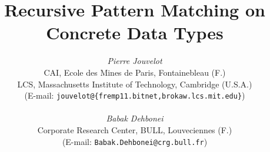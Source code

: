 
\title{Recursive Pattern Matching on Concrete Data Types}

\author{{\em Pierre Jouvelot} \\
CAI, Ecole des Mines de Paris, Fontainebleau (F.) \\
LCS, Massachusetts Institute of Technology, Cambridge (U.S.A.) \\
({\small E-mail: {\tt jouvelot@\{fremp11.bitnet,brokaw.lcs.mit.edu\}}}) \\
\\
{\em Babak Dehbonei} \\
Corporate Research Center, BULL, Louveciennes (F.) \\
({\small E-mail: {\tt Babak.Dehbonei@crg.bull.fr}})}

\date{}

\newcommand{\rpm}{{\tt rpm}}
\newcommand{\E}{\mbox{${\cal E}$}}
\newcommand{\C}{\mbox{${\cal C}$}}
\renewcommand{\P}{\mbox{${\cal P}$}}
\newcommand{\dbl}[1]{\mbox{$\lbrack\!\lbrack$~{\tt #1}~$\rbrack\!\rbrack$}}
\newcommand{\Exp}{{\rm Expression}}
\newcommand{\Ide}{{\rm Identifier}}
\newcommand{\Cl}{{\rm Clause}}
\newcommand{\Pat}{{\rm Pattern}}


